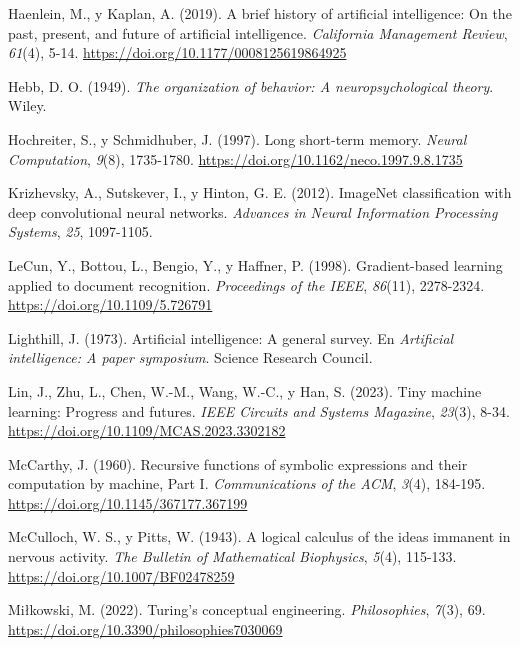 \documentclass[12pt,letterpaper,oneside]{article}
\newenvironment{referencias}
  {\begin{list}{}{%
      \setlength{\leftmargin}{1.25cm}%
      \setlength{\itemindent}{-1.25cm}%
      \setlength{\itemsep}{0.6em}%
      \setlength{\parsep}{0pt}}%
   \setstretch{1.1}}
  {\end{list}}
\begin{document}
\begin{referencias}
\item Haenlein, M., y Kaplan, A. (2019). A brief history of artificial intelligence: On the past, present, and future of artificial intelligence. \textit{California Management Review}, \textit{61}(4), 5-14. \url{https://doi.org/10.1177/0008125619864925}

\item Hebb, D. O. (1949). \textit{The organization of behavior: A neuropsychological theory}. Wiley.

\item Hochreiter, S., y Schmidhuber, J. (1997). Long short-term memory. \textit{Neural Computation}, \textit{9}(8), 1735-1780. \url{https://doi.org/10.1162/neco.1997.9.8.1735}

\item Krizhevsky, A., Sutskever, I., y Hinton, G. E. (2012). ImageNet classification with deep convolutional neural networks. \textit{Advances in Neural Information Processing Systems}, \textit{25}, 1097-1105.

\item LeCun, Y., Bottou, L., Bengio, Y., y Haffner, P. (1998). Gradient-based learning applied to document recognition. \textit{Proceedings of the IEEE}, \textit{86}(11), 2278-2324. \url{https://doi.org/10.1109/5.726791}

\item Lighthill, J. (1973). Artificial intelligence: A general survey. En \textit{Artificial intelligence: A paper symposium}. Science Research Council.

\item Lin, J., Zhu, L., Chen, W.-M., Wang, W.-C., y Han, S. (2023). Tiny machine learning: Progress and futures. \textit{IEEE Circuits and Systems Magazine}, \textit{23}(3), 8-34. \url{https://doi.org/10.1109/MCAS.2023.3302182}

\item McCarthy, J. (1960). Recursive functions of symbolic expressions and their computation by machine, Part I. \textit{Communications of the ACM}, \textit{3}(4), 184-195. \url{https://doi.org/10.1145/367177.367199}

\item McCulloch, W. S., y Pitts, W. (1943). A logical calculus of the ideas immanent in nervous activity. \textit{The Bulletin of Mathematical Biophysics}, \textit{5}(4), 115-133. \url{https://doi.org/10.1007/BF02478259}

\item Miłkowski, M. (2022). Turing's conceptual engineering. \textit{Philosophies}, \textit{7}(3), 69. \url{https://doi.org/10.3390/philosophies7030069}


\end{referencias}
\end{document}
